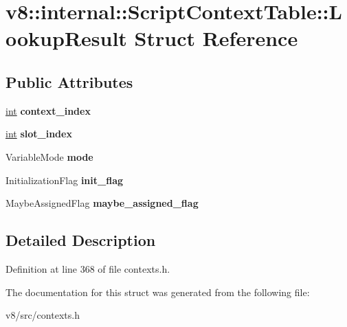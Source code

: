 \hypertarget{structv8_1_1internal_1_1ScriptContextTable_1_1LookupResult}{}\section{v8\+:\+:internal\+:\+:Script\+Context\+Table\+:\+:Lookup\+Result Struct Reference}
\label{structv8_1_1internal_1_1ScriptContextTable_1_1LookupResult}
\subsection*{Public Attributes}
\begin{DoxyCompactItemize}
\item 
\mbox{\label{structv8_1_1internal_1_1ScriptContextTable_1_1LookupResult_a9dd961b81d9e2b4ea670884db1e68662}} 
\mbox{\hyperlink{classint}{int}} {\bfseries context\+\_\+index}
\item 
\mbox{\label{structv8_1_1internal_1_1ScriptContextTable_1_1LookupResult_a5ae6b82c7056ff4021919c585d29ef7b}} 
\mbox{\hyperlink{classint}{int}} {\bfseries slot\+\_\+index}
\item 
\mbox{\label{structv8_1_1internal_1_1ScriptContextTable_1_1LookupResult_a3900356f30ed0ff4da71d6dbfe861edd}} 
Variable\+Mode {\bfseries mode}
\item 
\mbox{\label{structv8_1_1internal_1_1ScriptContextTable_1_1LookupResult_a063fc47e9238f03f628ec404481ee3da}} 
Initialization\+Flag {\bfseries init\+\_\+flag}
\item 
\mbox{\label{structv8_1_1internal_1_1ScriptContextTable_1_1LookupResult_af419a2ccd3b19aa5e14beedaf8aadf34}} 
Maybe\+Assigned\+Flag {\bfseries maybe\+\_\+assigned\+\_\+flag}
\end{DoxyCompactItemize}


\subsection{Detailed Description}


Definition at line 368 of file contexts.\+h.



The documentation for this struct was generated from the following file\+:\begin{DoxyCompactItemize}
\item 
v8/src/contexts.\+h\end{DoxyCompactItemize}
